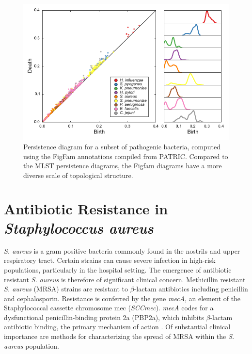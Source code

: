 \begin{figure}
\centering
\includegraphics[width=\textwidth]{./fig/pathogens/figfam_persistent_diagram.pdf}
\caption[Genome-wide reticulation patterns in pathogenic bacteria from protein annotations]{Persistence diagram for a subset of pathogenic bacteria, computed using the FigFam annotations compiled from PATRIC. Compared to the MLST persistence diagrams, the Figfam diagrams have a more diverse scale of topological structure.}
\label{fig:figfam_persistence_diagram}
\end{figure}

\section{Antibiotic Resistance in \emph{Staphylococcus aureus}}
\label{sec:staph_aureus}
%
\emph{S. aureus} is a gram positive bacteria commonly found in the nostrils and upper respiratory tract.
Certain strains can cause severe infection in high-risk populations, particularly in the hospital setting.
The emergence of antibiotic resistant \emph{S. aureus} is therefore of significant clinical concern.
Methicillin resistant \emph{S. aureus} (MRSA) strains are resistant to $\beta$-lactam antibiotics including penicillin and cephalosporin.
Resistance is conferred by the gene \emph{mecA}, an element of the Staphylococcal cassette chromosome mec (\emph{SCCmec}).
\emph{mecA} codes for a dysfunctional penicillin-binding protein 2a (PBP2a), which inhibits $\beta$-lactam antibiotic binding, the primary mechanism of action \cite{Jensen:2009fu}.
Of substantial clinical importance are methods for characterizing the spread of MRSA within the \emph{S. aureus} population.


